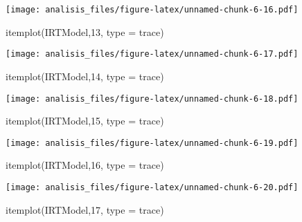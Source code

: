 \documentclass[
]{article}
\newenvironment{Shaded}{\begin{snugshade}}{\end{snugshade}}
\newcommand{\AttributeTok}[1]{\textcolor[rgb]{0.77,0.63,0.00}{#1}}
\newcommand{\DecValTok}[1]{\textcolor[rgb]{0.00,0.00,0.81}{#1}}
\newcommand{\FunctionTok}[1]{\textcolor[rgb]{0.00,0.00,0.00}{#1}}
\newcommand{\NormalTok}[1]{#1}
\newcommand{\StringTok}[1]{\textcolor[rgb]{0.31,0.60,0.02}{#1}}
\begin{document}
\texttt{[image: analisis\_files/figure-latex/unnamed-chunk-6-16.pdf]}

\begin{Shaded}
\begin{Highlighting}[]
\FunctionTok{itemplot}\NormalTok{(IRTModel,}\DecValTok{13}\NormalTok{, }\AttributeTok{type =} \StringTok{\textquotesingle{}trace\textquotesingle{}}\NormalTok{)}
\end{Highlighting}
\end{Shaded}

\texttt{[image: analisis\_files/figure-latex/unnamed-chunk-6-17.pdf]}

\begin{Shaded}
\begin{Highlighting}[]
\FunctionTok{itemplot}\NormalTok{(IRTModel,}\DecValTok{14}\NormalTok{, }\AttributeTok{type =} \StringTok{\textquotesingle{}trace\textquotesingle{}}\NormalTok{)}
\end{Highlighting}
\end{Shaded}

\texttt{[image: analisis\_files/figure-latex/unnamed-chunk-6-18.pdf]}

\begin{Shaded}
\begin{Highlighting}[]
\FunctionTok{itemplot}\NormalTok{(IRTModel,}\DecValTok{15}\NormalTok{, }\AttributeTok{type =} \StringTok{\textquotesingle{}trace\textquotesingle{}}\NormalTok{)}
\end{Highlighting}
\end{Shaded}

\texttt{[image: analisis\_files/figure-latex/unnamed-chunk-6-19.pdf]}

\begin{Shaded}
\begin{Highlighting}[]
\FunctionTok{itemplot}\NormalTok{(IRTModel,}\DecValTok{16}\NormalTok{, }\AttributeTok{type =} \StringTok{\textquotesingle{}trace\textquotesingle{}}\NormalTok{)}
\end{Highlighting}
\end{Shaded}

\texttt{[image: analisis\_files/figure-latex/unnamed-chunk-6-20.pdf]}

\begin{Shaded}
\begin{Highlighting}[]
\FunctionTok{itemplot}\NormalTok{(IRTModel,}\DecValTok{17}\NormalTok{, }\AttributeTok{type =} \StringTok{\textquotesingle{}trace\textquotesingle{}}\NormalTok{)}
\end{Highlighting}
\end{Shaded}
\end{document}
